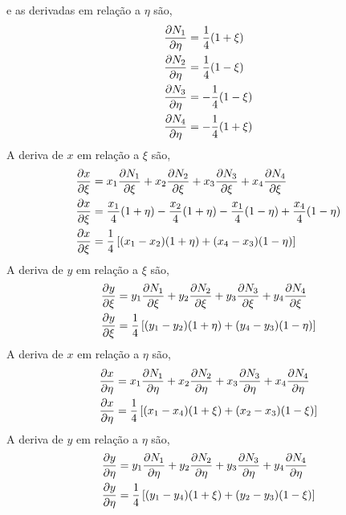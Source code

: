 %
e as derivadas em relação a $\eta$ são,
\begin{equation}
	\begin{split}
		&\frac{\partial N_1}{\partial \eta} = \frac{1}{4}(1 + \xi)\\
		&\frac{\partial N_2}{\partial \eta} = \frac{1}{4}(1 - \xi)\\
		&\frac{\partial N_3}{\partial \eta} =-\frac{1}{4}(1 - \xi)\\
		&\frac{\partial N_4}{\partial \eta} =-\frac{1}{4}(1 + \xi)\\
	\end{split}
\end{equation}
%
A deriva de $x$ em relação a  $\xi$ são,
%
\begin{equation}
	\begin{split}
&	\frac{\partial x}{\partial \xi} = x_1 \frac{\partial N_1}{\partial \xi} + x_2 \frac{\partial N_2}{\partial \xi} + x_3 \frac{\partial N_3}{\partial \xi} + x_4 \frac{\partial N_4}{\partial \xi}\\
&   \frac{\partial x}{\partial \xi} = \frac{x_1}{4} (1 + \eta) - \frac{x_2}{4} (1 + \eta) - \frac{x_1}{4} (1 - \eta) + \frac{x_4}{4} (1 - \eta)\\
&   \frac{\partial x}{\partial \xi} = \frac{1}{4}\left[ (x_1 - x_2)(1 + \eta) + (x_4 - x_3)(1 - \eta) \right]
	\end{split}
\end{equation}
%
A deriva de $y$ em relação a  $\xi$ são,
%
\begin{equation}
	\begin{split}
		&	\frac{\partial y}{\partial \xi} = y_1 \frac{\partial N_1}{\partial \xi} + y_2 \frac{\partial N_2}{\partial \xi} + y_3 \frac{\partial N_3}{\partial \xi} + y_4 \frac{\partial N_4}{\partial \xi}\\
		&   \frac{\partial y}{\partial \xi} = \frac{1}{4}\left[ (y_1 - y_2)(1 + \eta) + (y_4 - y_3)(1 - \eta) \right]
	\end{split}
\end{equation}
%
A deriva de $x$ em relação a  $\eta$ são,
%
\begin{equation}
	\begin{split}
		&	\frac{\partial x}{\partial \eta} = x_1 \frac{\partial N_1}{\partial \eta} + x_2 \frac{\partial N_2}{\partial \eta} + x_3 \frac{\partial N_3}{\partial \eta} + x_4 \frac{\partial N_4}{\partial \eta}\\
		&   \frac{\partial x}{\partial \eta} = \frac{1}{4}\left[ (x_1 - x_4)(1 + \xi) + (x_2 - x_3)(1 - \xi) \right]
	\end{split}
\end{equation}
%
A deriva de $y$ em relação a  $\eta$ são,
%
\begin{equation}
	\begin{split}
		&	\frac{\partial y}{\partial \eta} = y_1 \frac{\partial N_1}{\partial \eta} + y_2 \frac{\partial N_2}{\partial \eta} + y_3 \frac{\partial N_3}{\partial \eta} + y_4 \frac{\partial N_4}{\partial \eta}\\
		&   \frac{\partial y}{\partial \eta} = \frac{1}{4}\left[ (y_1 - y_4)(1 + \xi) + (y_2 - y_3)(1 - \xi) \right]
	\end{split}
\end{equation}
